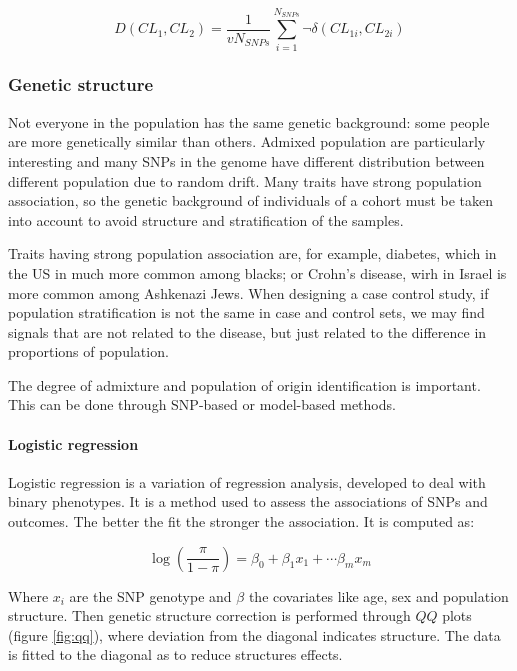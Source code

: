 		$$D(CL_1, CL_2) = \frac{1}{vN_{SNPs}} \sum\limits_{i=1}^{N_{SNPs}} \neg\delta(CL_{1i}, CL_{2i})$$

		\subsubsection{Genetic structure}
		Not everyone in the population has the same genetic background: some people are more genetically similar than others.
		Admixed population are particularly interesting and many SNPs in the genome have different distribution between different population due to random drift.
		Many traits have strong population association, so the genetic background of individuals of a cohort must be taken into account to avoid structure and stratification of the samples.
		
		Traits having strong population association are, for example, diabetes, which in the US in much more common among blacks; or Crohn's disease, wirh in Israel is more common among Ashkenazi Jews.
		When designing a case control study, if population stratification is not the same in case and control sets, we may find signals that are not related to the disease, but just related to the difference in proportions of population.
		
		The degree of admixture and population of origin identification is important.
		This can be done through SNP-based or model-based methods.

			\paragraph{Logistic regression}
			Logistic regression is a variation of regression analysis, developed to deal with binary phenotypes.
			It is a method used to assess the associations of SNPs and outcomes.
			The better the fit the stronger the association.
			It is computed as:

			$$\log(\frac{\pi}{1-\pi}) = \beta_0+\beta_1x_1+\cdots \beta_mx_m$$

			Where $x_i$ are the SNP genotype and $\beta$ the covariates like age, sex and population structure.
			Then genetic structure correction is performed through $QQ$ plots (figure \ref{fig:qq}), where deviation from the diagonal indicates structure.
			The data is fitted to the diagonal as to reduce structures effects.


